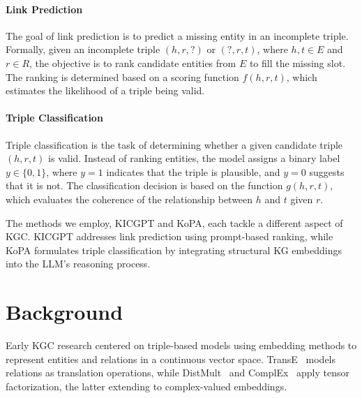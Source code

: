 \documentclass[12pt,a4paper]{article}
\begin{document}
\paragraph{Link Prediction}
The goal of link prediction is to predict a missing entity in an incomplete triple. Formally, given an incomplete triple \( (h, r, ?) \) or \( (?, r, t) \), where \( h, t \in E \) and \( r \in R \), the objective is to rank candidate entities from \( E \) to fill the missing slot. The ranking is determined based on a scoring function \( f(h, r, t) \), which estimates the likelihood of a triple being valid.

\paragraph{Triple Classification}
Triple classification is the task of determining whether a given candidate triple \( (h, r, t) \) is valid. Instead of ranking entities, the model assigns a binary label \( y \in \{0,1\} \), where \( y = 1 \) indicates that the triple is plausible, and \( y = 0 \) suggests that it is not. The classification decision is based on the function \( g(h, r, t) \), which evaluates the coherence of the relationship between \( h \) and \( t \) given \( r \).

The methods we employ, KICGPT and KoPA, each tackle a different aspect of KGC. KICGPT addresses link prediction using prompt-based ranking, while KoPA formulates triple classification by integrating structural KG embeddings into the LLM’s reasoning process.


%
%


\section{Background}\label{sec:background}

Early KGC research centered on triple-based models using embedding methods to represent entities and relations in a continuous vector space.
TransE~\cite{bordes2013translating} models relations as translation operations, while DistMult~\cite{yang2014embedding} and ComplEx~\cite{trouillon2016complex} apply tensor factorization, the latter extending to complex-valued embeddings.

\end{document}
